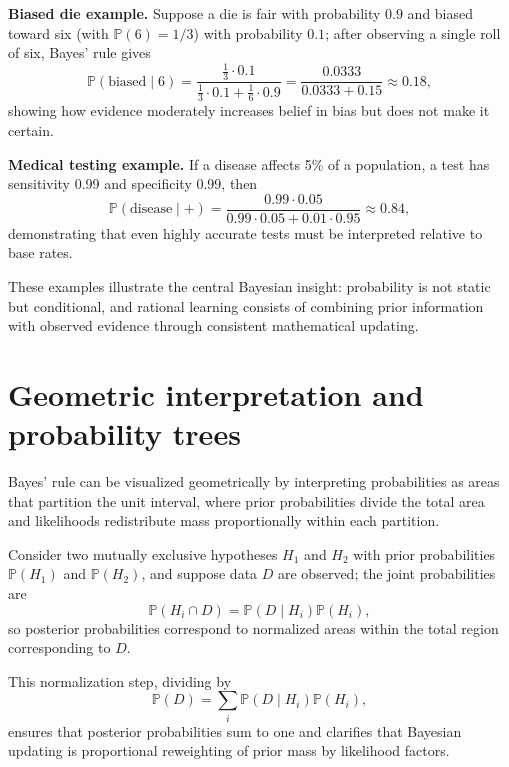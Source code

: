 \medskip

\textbf{Biased die example.} Suppose a die is fair with probability \(0.9\) and biased toward six (with \(\mathbb{P}(6)=1/3\)) with probability \(0.1\); after observing a single roll of six, Bayes’ rule gives
\[
\mathbb{P}(\text{biased} \mid 6) = \frac{\frac{1}{3}\cdot 0.1}{\frac{1}{3}\cdot 0.1 + \frac{1}{6}\cdot 0.9} = \frac{0.0333}{0.0333 + 0.15} \approx 0.18,
\]
showing how evidence moderately increases belief in bias but does not make it certain. 

\medskip

\textbf{Medical testing example.} If a disease affects 5\% of a population, a test has sensitivity 0.99 and specificity 0.99, then 
\[
\mathbb{P}(\text{disease} \mid +) = \frac{0.99 \cdot 0.05}{0.99 \cdot 0.05 + 0.01 \cdot 0.95} \approx 0.84,
\]
demonstrating that even highly accurate tests must be interpreted relative to base rates. 

\medskip

These examples illustrate the central Bayesian insight: probability is not static but conditional, and rational learning consists of combining prior information with observed evidence through consistent mathematical updating. 


\section{Geometric interpretation and probability trees}

Bayes’ rule can be visualized geometrically by interpreting probabilities as areas that partition the unit interval, where prior probabilities divide the total area and likelihoods redistribute mass proportionally within each partition. 

\medskip

Consider two mutually exclusive hypotheses \(H_1\) and \(H_2\) with prior probabilities \(\mathbb{P}(H_1)\) and \(\mathbb{P}(H_2)\), and suppose data \(D\) are observed; the joint probabilities are 
\[
\mathbb{P}(H_i \cap D) = \mathbb{P}(D \mid H_i)\mathbb{P}(H_i),
\]
so posterior probabilities correspond to normalized areas within the total region corresponding to \(D\). 

\medskip

This normalization step, dividing by 
\[
\mathbb{P}(D) = \sum_i \mathbb{P}(D \mid H_i)\mathbb{P}(H_i),
\]
ensures that posterior probabilities sum to one and clarifies that Bayesian updating is proportional reweighting of prior mass by likelihood factors. 

